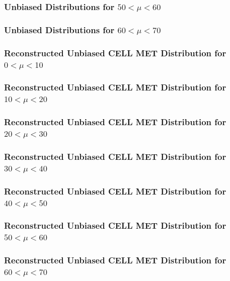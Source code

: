 \documentclass[]{beamer}
\begin{document}
\begin{frame}
        \frametitle{Unbiased Distributions for $50<\mu<60$}
\end{frame}
\begin{frame}
        \frametitle{Unbiased Distributions for $60<\mu<70$}
\end{frame}
\begin{frame}
        \frametitle{Reconstructed Unbiased CELL MET Distribution for $0<\mu<10$}
\end{frame}
\begin{frame}
        \frametitle{Reconstructed Unbiased CELL MET Distribution for $10<\mu<20$}
\end{frame}
\begin{frame}
        \frametitle{Reconstructed Unbiased CELL MET Distribution for $20<\mu<30$}
\end{frame}
\begin{frame}
        \frametitle{Reconstructed Unbiased CELL MET Distribution for $30<\mu<40$}
\end{frame}
\begin{frame}
        \frametitle{Reconstructed Unbiased CELL MET Distribution for $40<\mu<50$}
\end{frame}
\begin{frame}
        \frametitle{Reconstructed Unbiased CELL MET Distribution for $50<\mu<60$}
\end{frame}
\begin{frame}
        \frametitle{Reconstructed Unbiased CELL MET Distribution for $60<\mu<70$}
\end{frame}
\end{document}

